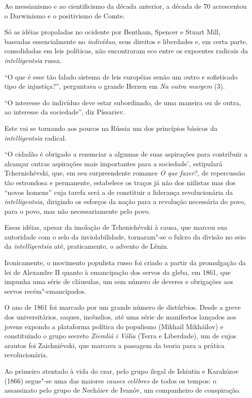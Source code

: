 Ao messianismo e ao cientificismo da década anterior, a década de 70
acrescentou o Darwinismo e o positivismo de Comte.

Só as idéias propaladas no ocidente por Bentham, Spencer e Stuart Mill,
baseadas essencialmente no \emph{indivíduo}, seus direitos e liberdades
e, em certa parte, consolidadas em leis políticas, não encontraram eco
entre os expoentes radicais da \emph{intelligentsia} russa.

``O que é esse tão falado sistema de leis européias senão um outro e
sofisticado tipo de injustiça?'', perguntava o grande Herzen em \emph{Na
outra margem} (3).

``O interesse do indivíduo deve estar subordinado, de uma maneira ou de
outra, ao interesse da sociedade'', diz Píssariev.

Este vai se tornando aos poucos na Rússia um dos princípios básicos da
\emph{intelligentsia} radical.

``O cidadão é obrigado a renunciar a algumas de suas aspirações para
contribuir a alcançar outras aspirações mais importantes para a
sociedade', estipulará Tchernichévski, que, em seu surpreendente romance
\emph{O que fazer}?, de repercussão tão estrondosa e permanente,
estabelece os traços já não dos niilistas mas dos ``novos homens'' cuja
tarefa será a de constituir a liderança revolucionária da
\emph{intelligentsia,} dirigindo os esforços da nação para a revolução
necessária do povo, para o povo, mas não necessariamente pelo povo.

Essas idéias, apesar da imolação de Tchenichévski à causa, que marcou
sua autoridade com o selo da inviolabilidade, tornaram"-se o fulcro da
divisão no seio da \emph{intelligentsia} até, praticamente, o advento de
Lênin.

Ironicamente, o movimento populista russo foi criado a partir da
promulgação da lei de Alexandre II quanto à emancipação dos servos da
gleba, em 1861, que impunha uma série de cláusulas, um sem número de
deveres e obrigações aos servos recém"-emancipados.

O ano de 1861 foi marcado por um grande número de distúrbios. Desde a
greve dos universitários, saques, incêndios, até uma série de manifestos
lançados aos jovens expondo a plataforma política do populismo (Mikhail
Mikháilov) e constituindo o grupo secreto \emph{Ziemliá i Vólia} (Terra
e Liberdade), um de cujos arautos foi Zaichniévski, que marcava a
passagem da teoria para a prática revolucionária.

Ao primeiro atentado à vida do czar, pelo grupo ilegal de Ishiutin e
Karakózov (1866) segue"-se uma das maiores \emph{causes celèbres} de
todos os tempos: o assassinato pelo grupo de Necháiev de Ivanóv, um
companheiro de conspiração.


